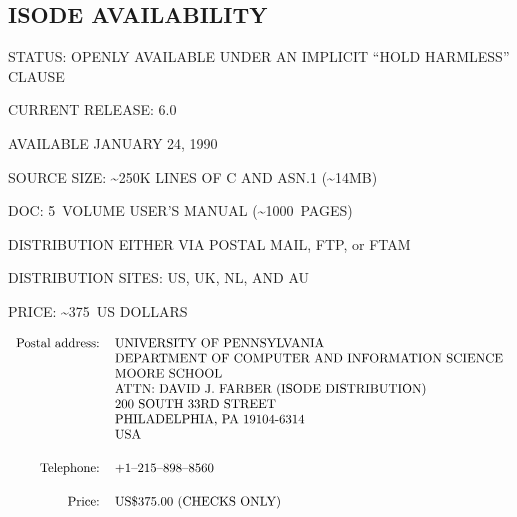 
\begin{bwslide}
\part*	{ISODE AVAILABILITY}\bf

\begin{nrtc}
\item	STATUS: OPENLY AVAILABLE UNDER AN IMPLICIT ``HOLD HARMLESS'' CLAUSE

\item	CURRENT RELEASE: 6.0
    \begin{nrtc}
    \item	AVAILABLE JANUARY 24, 1990
    \end{nrtc}

\item	SOURCE SIZE: \~{}250K LINES OF C AND ASN.1 (\~{}14MB)

\item	DOC: 5~VOLUME USER'S MANUAL (\~{}1000~PAGES)

\item	DISTRIBUTION EITHER VIA POSTAL MAIL, FTP, or FTAM
    \begin{nrtc}
    \item	DISTRIBUTION SITES: US, UK, NL, AND AU

    \item	PRICE: \~{}375~US DOLLARS
    \end{nrtc}
\end{nrtc}
\end{bwslide}


\begin{bwslide}
\small

\[\begin{tabular}{rl}
Postal address:&UNIVERSITY OF PENNSYLVANIA\\
&		DEPARTMENT OF COMPUTER AND INFORMATION SCIENCE\\
&		MOORE SCHOOL\\
&		ATTN: DAVID J. FARBER (ISODE DISTRIBUTION)\\
&		200 SOUTH 33RD STREET\\
&		PHILADELPHIA, PA 19104-6314\\
&		USA\\[0.2in]
Telephone:&	+1--215--898--8560\\[0.2in]
Price:&		US\$375.00 (CHECKS ONLY)
\end{tabular}\]
\end{bwslide}


